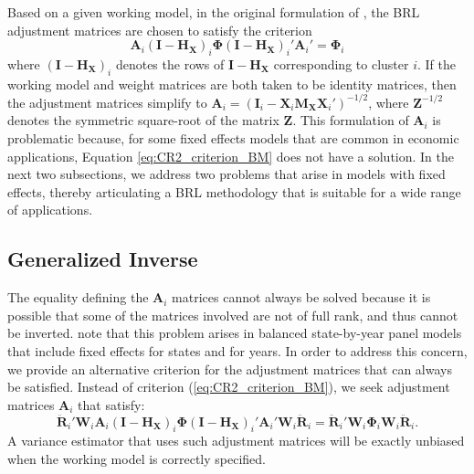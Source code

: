 \documentclass[12pt]{article}\usepackage[]{graphicx}\usepackage[]{color}
\newcommand{\bm}{\mathbf}
\newcommand{\bs}{\boldsymbol}
\begin{document}
Based on a given working model, in the original formulation of \citet{Bell2002bias}, the BRL adjustment matrices are chosen to satisfy the criterion
\begin{equation}
\label{eq:CR2_criterion_BM}
\bm{A}_i \left(\bm{I} - \bm{H_X}\right)_i \bs\Phi \left(\bm{I} - \bm{H_X}\right)_i' \bm{A}_i'  =  \bs\Phi_i 
\end{equation}
where $\left(\bm{I} - \bm{H_X}\right)_i$ denotes the rows of $\bm{I} - \bm{H_X}$ corresponding to cluster $i$.
If the working model and weight matrices are both taken to be identity matrices, then the adjustment matrices simplify to $\bm{A}_i = \left(\bm{I}_i - \bm{X}_i\bm{M_X} \bm{X}_i'\right)^{-1/2}$, where $\bm{Z}^{-1/2}$ denotes the symmetric square-root of the matrix $\bm{Z}$. 
This formulation of $\bm{A}_i$ is problematic because, for some fixed effects models that are common in economic applications, Equation \ref{eq:CR2_criterion_BM} does not have a solution. 
In the next two subsections, we address two problems that arise in models with fixed effects, thereby articulating a BRL methodology that is suitable for a wide range of applications.

\subsection{Generalized Inverse}

The equality defining the $\bm{A}_i$ matrices cannot always be solved because it is possible that some of the matrices involved are not of full rank, and thus cannot be inverted. 
\citet{Angrist2009mostly} note that this problem arises in balanced state-by-year panel models that include fixed effects for states and for years. 
In order to address this concern, we provide an alternative criterion for the adjustment matrices that can always be satisfied. 
Instead of criterion (\ref{eq:CR2_criterion_BM}), we seek adjustment matrices $\bm{A}_i$ that satisfy:
\begin{equation}
\label{eq:CR2_criterion}
\bm{\ddot{R}}_i' \bm{W}_i \bm{A}_i \left(\bm{I} - \bm{H_X}\right)_i \bs\Phi \left(\bm{I} - \bm{H_X}\right)_i' \bm{A}_i' \bm{W}_i \bm{\ddot{R}}_i = \bm{\ddot{R}}_i' \bm{W}_i \bs\Phi_i \bm{W}_i \bm{\ddot{R}}_i.
\end{equation}
A variance estimator that uses such adjustment matrices will be exactly unbiased when the working model is correctly specified.
\end{document}
